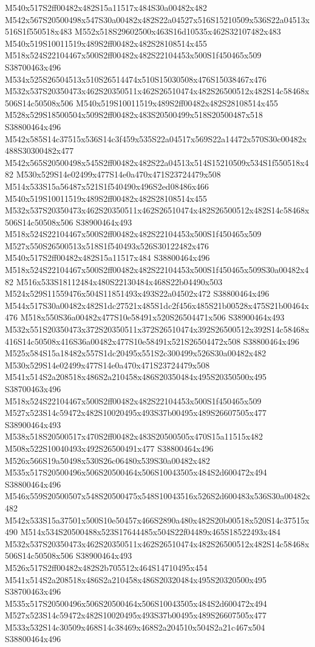 \documentclass{article}
\begin{document}
\begin{multicols}{2}
M540x517S2ff00482x482S15a11517x484S30a00482x482 M542x567S20500498x547S30a00482x482S22a04527x516S15210509x536S22a04513x516S1f550518x483 M552x518S29602500x463S16d10535x462S32107482x483 M540x519S10011519x489S2ff00482x482S28108514x455 M518x524S22104467x500S2ff00482x482S22104453x500S1f450465x509 S38700463x496 M534x525S26504513x510S26514474x510S15030508x476S15038467x476 M532x537S20350473x462S20350511x462S26510474x482S26500512x482S14c58468x506S14c50508x506 M540x519S10011519x489S2ff00482x482S28108514x455 M528x529S18500504x509S2ff00482x483S20500499x518S20500487x518 S38800464x496 M542x585S14c37515x536S14c3f459x535S22a04517x569S22a14472x570S30c00482x488S30300482x477 M542x565S20500498x545S2ff00482x482S22a04513x514S15210509x534S1f550518x482 M530x529S14e02499x477S14e0a470x471S23724479x508 M514x533S15a56487x521S1f540490x496S2ed08486x466 M540x519S10011519x489S2ff00482x482S28108514x455 M532x537S20350473x462S20350511x462S26510474x482S26500512x482S14c58468x506S14c50508x506 S38900464x493 M518x524S22104467x500S2ff00482x482S22104453x500S1f450465x509 M527x550S26500513x518S1f540493x526S30122482x476 M540x517S2ff00482x482S15a11517x484 S38800464x496 M518x524S22104467x500S2ff00482x482S22104453x500S1f450465x509S30a00482x482 M516x533S18112484x480S22130484x468S22b04490x503 M524x529S11559476x504S11851493x493S22a04502x472 S38800464x496 M544x517S30a00482x482S1dc27521x485S1dc2f456x485S21b00528x475S21b00464x476 M518x550S36a00482x477S10e58491x520S26504471x506 S38900464x493 M532x551S20350473x372S20350511x372S26510474x392S26500512x392S14c58468x416S14c50508x416S36a00482x477S10e58491x521S26504472x508 S38800464x496 M525x584S15a18482x557S1dc20495x551S2c300499x526S30a00482x482 M530x529S14e02499x477S14e0a470x471S23724479x508 M541x514S2a208518x486S2a210458x486S20350484x495S20350500x495 S38700463x496 M518x524S22104467x500S2ff00482x482S22104453x500S1f450465x509 M527x523S14c59472x482S10020495x493S37b00495x489S26607505x477 S38900464x493 M538x518S20500517x470S2ff00482x483S20500505x470S15a11515x482 M508x522S10040493x492S26500491x477 S38800464x496 M526x566S19a50498x530S26c06480x539S30a00482x482 M535x517S20500496x506S20500464x506S10043505x484S2d600472x494 S38800464x496 M546x559S20500507x548S20500475x548S10043516x526S2d600483x536S30a00482x482 M542x533S15a37501x500S10e50457x466S2890a480x482S20b00518x520S14c37515x490 M514x534S20500488x523S17644485x504S22f04489x465S18522493x484 M532x537S20350473x462S20350511x462S26510474x482S26500512x482S14c58468x506S14c50508x506 S38900464x493 M526x517S2ff00482x482S2b705512x464S14710495x454 M541x514S2a208518x486S2a210458x486S20320484x495S20320500x495 S38700463x496 M535x517S20500496x506S20500464x506S10043505x484S2d600472x494 M527x523S14c59472x482S10020495x493S37b00495x489S26607505x477 M533x532S14c30509x468S14c38469x468S2a204510x504S2a21c467x504 S38800464x496


\end{multicols}
\end{document}
